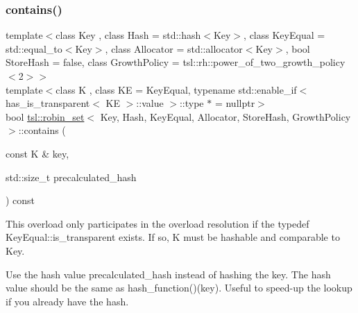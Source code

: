 \subsubsection{\texorpdfstring{contains()}{contains()}\hspace{0.1cm}{\footnotesize\ttfamily [3/3]}}
{\footnotesize\ttfamily template$<$class Key , class Hash  = std\+::hash$<$\+Key$>$, class Key\+Equal  = std\+::equal\+\_\+to$<$\+Key$>$, class Allocator  = std\+::allocator$<$\+Key$>$, bool Store\+Hash = false, class Growth\+Policy  = tsl\+::rh\+::power\+\_\+of\+\_\+two\+\_\+growth\+\_\+policy$<$2$>$$>$ \\
template$<$class K , class KE  = Key\+Equal, typename std\+::enable\+\_\+if$<$ has\+\_\+is\+\_\+transparent$<$ K\+E $>$\+::value $>$\+::type $\ast$  = nullptr$>$ \\
bool \mbox{\hyperlink{classtsl_1_1robin__set}{tsl\+::robin\+\_\+set}}$<$ Key, Hash, Key\+Equal, Allocator, Store\+Hash, Growth\+Policy $>$\+::contains (\begin{DoxyParamCaption}\item[{const K \&}]{key,  }\item[{std\+::size\+\_\+t}]{precalculated\+\_\+hash }\end{DoxyParamCaption}) const\hspace{0.3cm}{\ttfamily [inline]}}





This overload only participates in the overload resolution if the typedef Key\+Equal\+::is\+\_\+transparent exists. If so, K must be hashable and comparable to Key.

Use the hash value \textquotesingle{}precalculated\+\_\+hash\textquotesingle{} instead of hashing the key. The hash value should be the same as hash\+\_\+function()(key). Useful to speed-\/up the lookup if you already have the hash. \mbox{\label{classtsl_1_1robin__set_af62044d0daa7d75e90ee002f38b9837a}} 
